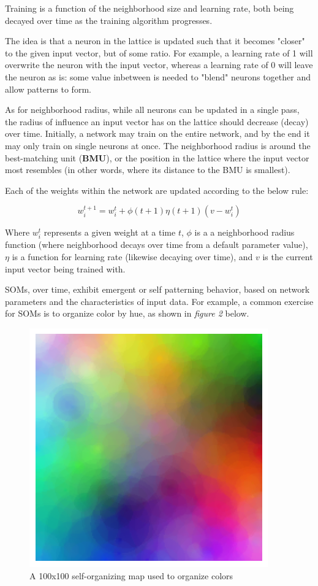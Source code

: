 \documentclass[a4paper,12pt]{article}
\begin{document}
\pagebreak

Training is a function of the neighborhood size and learning rate, both being decayed over time as the training algorithm progresses. 

The idea is that a neuron in the lattice is updated such that it becomes "closer" to the given input vector, but of some ratio. For example, a learning rate of 1 will overwrite the neuron with the input vector, whereas a learning rate of 0 will leave the neuron as is: some value inbetween is needed to "blend" neurons together and allow patterns to form.

As for neighborhood radius, while all neurons can be updated in a single pass, the radius of influence an input vector has on the lattice should decrease (decay) over time. Initially, a network may train on the entire network, and by the end it may only train on single neurons at once. The neighborhood radius is around the best-matching unit (\textbf{BMU}), or the position in the lattice where the input vector most resembles (in other words, where its distance to the BMU is smallest).

Each of the weights within the network are updated according to the below rule:

{\Large $$w_i^{t+1} = w_i^t + \phi{(t+1)}\eta{(t+1)}(v - w_i^t)$$}

Where $w_i^t$ represents a given weight at a time $t$, $\phi{}$ is a a neighborhood radius function (where neighborhood decays over time from a default parameter value), $\eta{}$ is a function for learning rate (likewise decaying over time), and $v$ is the current input vector being trained with.

SOMs, over time, exhibit emergent or self patterning behavior, based on network parameters and the characteristics of input data. For example, a common exercise for SOMs is to organize color by hue, as shown in \textit{figure 2} below.

\begin{figure}[h!]
\centering
\includegraphics[scale=0.75]{images/euclidean.png}
\caption{A 100x100 self-organizing map used to organize colors}
\label{fig:colormap}
\end{figure}
\end{document}
